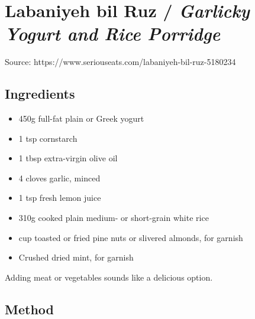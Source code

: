 \section{Labaniyeh bil Ruz / \emph{Garlicky Yogurt and Rice Porridge}}


Source: https://www.seriouseats.com/labaniyeh-bil-ruz-5180234

\subsection{Ingredients}

\begin{itemize}
    \item 450g full-fat plain or Greek yogurt 
    \item 1 tsp cornstarch
    \item 1 tbsp extra-virgin olive oil
    \item 4 cloves garlic, minced
    \item 1 tsp fresh lemon juice
    \item 310g cooked plain medium- or short-grain white rice
    \item {} cup toasted or fried pine nuts or slivered almonds, for garnish
    \item Crushed dried mint, for garnish
\end{itemize}

Adding meat or vegetables sounds like a delicious option.

\subsection{Method}

